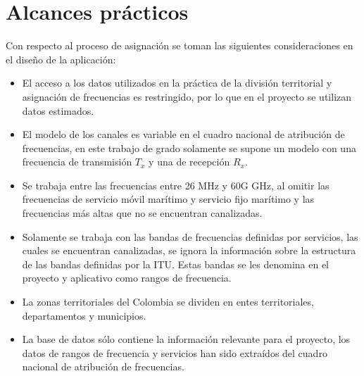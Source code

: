 \section{Alcances prácticos}

Con respecto al proceso de asignación se toman las siguientes consideraciones en el diseño de la aplicación:

\begin{itemize}
	\item El acceso a los datos utilizados en la práctica de la división territorial y asignación de frecuencias es restringido, por lo que en el proyecto se utilizan datos estimados.
	\item El modelo de los canales es variable en el cuadro nacional de atribución de frecuencias, en este trabajo de grado solamente se supone un modelo con una frecuencia de transmisión $T_{x}$ y una de recepción $R_{x}$.
	\item Se trabaja entre las frecuencias entre 26 MHz y 60G GHz, al omitir las frecuencias de servicio móvil marítimo y servicio fijo marítimo y las frecuencias más altas que no se encuentran canalizadas.
	\item Solamente se trabaja con las bandas de frecuencias definidas por servicios, las cuales se encuentran canalizadas, se ignora la información sobre la estructura de las bandas definidas por la ITU. Estas bandas se les denomina en el proyecto y aplicativo como rangos de frecuencia.
	\item La zonas territoriales del Colombia se dividen en entes territoriales, departamentos y municipios.
	\item La base de datos sólo contiene la información relevante para el proyecto, los datos de rangos de frecuencia y servicios han sido extraídos del cuadro nacional de atribución de frecuencias.
\end{itemize}

